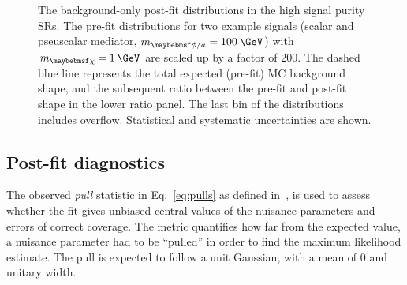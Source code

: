 \begin{figure}
  \caption{The background-only post-fit \ptmiss distributions in the high signal purity SRs. The pre-fit \ptmiss distributions for two example signals (scalar and pseuscalar mediator, $m_{\phi/a}=100\:\GeV$) with $m_{\chi}=1\:\GeV$ are scaled up by a factor of 200. The dashed blue line represents the total expected (pre-fit) MC background \ptmiss shape, and the subsequent ratio between the pre-fit and post-fit shape in the lower ratio panel. The last bin of the distributions includes overflow. Statistical and systematic uncertainties are shown.}
  \label{fig:postfit_hi}
\end{figure}

\subsection{Post-fit diagnostics}

The observed \textit{pull} statistic in Eq.~\ref{eq:pulls} as defined in~\cite{Karbach:2012vg}, is used to assess whether the fit gives unbiased central values of the nuisance parameters and errors of correct coverage. The metric quantifies how far from the expected value, a nuisance parameter had to be ``pulled'' in order to find the maximum likelihood estimate. The pull is expected to follow a unit Gaussian, with a mean of 0 and unitary width.

